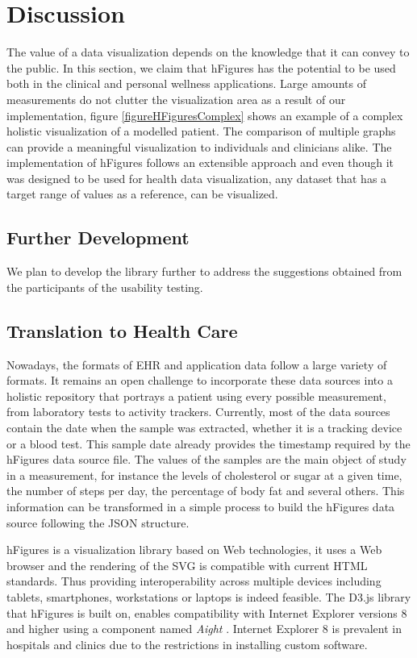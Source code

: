 \documentclass[twocolumn]{bmcart}%
\begin{document}
\section*{Discussion}

The value of a data visualization depends on the knowledge that it can convey to the public. In this section, we claim that hFigures has the potential to be used both in the clinical and personal wellness applications. Large amounts of measurements do not clutter the visualization area as a result of our implementation, figure \ref{figureHFiguresComplex} shows an example of a complex holistic visualization of a modelled patient. The comparison of multiple graphs can provide a meaningful visualization to individuals and clinicians alike. The implementation of hFigures follows an extensible approach and even though it was designed to be used for health data visualization, any dataset that has a target range of values as a reference, can be visualized.

\subsection*{Further Development}

We plan to develop the library further to address the suggestions obtained from the participants of the usability testing.

\subsection*{Translation to Health Care}

Nowadays, the formats of EHR and application data follow a large variety of formats. It remains an open challenge to incorporate these data sources into a holistic repository that portrays a patient using every possible measurement, from laboratory tests to activity trackers. Currently, most of the data sources contain the date when the sample was extracted, whether it is a tracking device or a blood test. This sample date already provides the timestamp required by the hFigures data source file. The values of the samples are the main object of study in a measurement, for instance the levels of cholesterol or sugar at a given time, the number of steps per day, the percentage of body fat and several others. This information can be transformed in a simple process to build the hFigures data source following the JSON structure.

hFigures is a visualization library based on Web technologies, it uses a Web browser and the rendering of the SVG is compatible with current HTML standards. Thus providing interoperability across multiple devices including tablets, smartphones, workstations or laptops is indeed feasible. The D3.js library that hFigures is built on, enables compatibility with Internet Explorer versions 8 and higher using a component named \textit{Aight} \cite{aight}. Internet Explorer 8 is prevalent in hospitals and clinics due to the restrictions in installing custom software.
\end{document}
